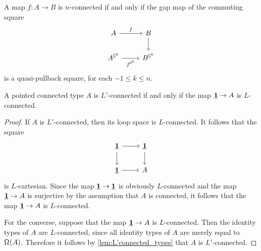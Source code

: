 \begin{cor}
A map $f:A\to B$ is $n$-connected if and only if the gap map of the commuting square
\begin{equation*}
\begin{tikzcd}
A \arrow[r,"f"] & B \arrow[d] \\
A^{\sphere{k}} \arrow[r,swap,"f^{\sphere{k}}"] & B^{\sphere{k}}
\end{tikzcd}
\end{equation*}
is a quasi-pullback square, for each $-1\leq k\leq n$.
\end{cor}

\begin{cor}\label{cor:ptd_connected}
A pointed connected type $A$ is $L'$-connected if and only if the map $\underline{\mathbf{1}}\to A$ is $L$-connected.
\end{cor}

\begin{proof}
If $A$ is $L'$-connected, then its loop space is $L$-connected. It follows that the square
\begin{equation*}
\begin{tikzcd}
\unit \arrow[r] \arrow[d] & \unit \arrow[d] \\
\unit \arrow[r] & A
\end{tikzcd}
\end{equation*}
is $L$-cartesian. Since the map $\underline{\mathbf{1}}\to\underline{\mathbf{1}}$ is obviously $L$-connected and the map $\underline{\mathbf{1}}\to A$ is surjective by the assumption that $A$ is connected, it follows that the map $\underline{\mathbf{1}}\to A$ is $L$-connected.

For the converse, suppose that the map $\underline{\mathbf{1}}\to A$ is $L$-connected. Then the identity types of $A$ are $L$-connected, since all identity types of $A$ are merely equal to $\mathsf{\Omega}^{}(A)$. Therefore it follows by \cref{lem:L'connected_types} that $A$ is $L'$-connected.
\end{proof}

